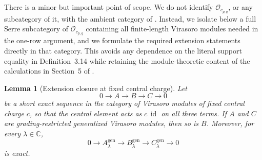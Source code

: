 \documentclass[12pt,leqno]{amsart}
\numberwithin{equation}{section}
\newtheorem{lem}[thm]{Lemma}
\newcommand{\id}{\operatorname{id}}
\newcommand{\Oc}{\mathcal O}
\def\C{\mathbb{C}}
\begin{document}
There is a minor but important point of scope.  We do not identify
$\Oc_{c_{p,q}}$, or any subcategory of it, with the ambient category of
\cite[Definition~3.14]{Nakano}.  Instead, we isolate below a full Serre
subcategory of $\Oc_{c_{p,q}}$ containing all finite-length Virasoro
modules needed in the one-row argument, and we formulate the required
extension statements directly in that category.  This avoids any
dependence on the literal support equality in Definition~3.14 while
retaining the module-theoretic content of the calculations in Section~5
of \cite{Nakano}.

\begin{lem}[Extension closure at fixed central charge]
\label{lem:gr-extension}
Let
\[
 0\longrightarrow A\longrightarrow B\longrightarrow C\longrightarrow0
\]
be a short exact sequence in the category of Virasoro modules of fixed
central charge $c$, so that the central element acts as $c\,\id$ on all
three terms.  If $A$ and $C$ are grading-restricted generalized Virasoro
modules, then so is $B$.  Moreover, for every $\lambda\in\C$,
\[
 0\longrightarrow A^{\mathrm{gen}}_\lambda
 \longrightarrow B^{\mathrm{gen}}_\lambda
 \longrightarrow C^{\mathrm{gen}}_\lambda
 \longrightarrow0
\]
is exact.
\end{lem}
\end{document}
